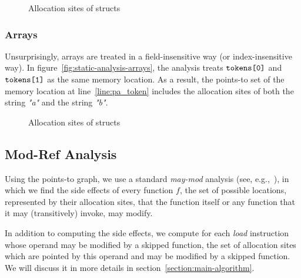 \begin{figure}
  \captionsetup[subfloat]{labelformat=empty}
  \subfloat[]{
    
    \label{fig:static-analysis-structs}
  }
  \caption{Allocation sites of structs}
\end{figure}

\subsubsection{Arrays}
Unsurprisingly, arrays are treated in a field-insensitive way (or index-insensitive way).
In figure~\ref{fig:static-analysis-arrays},
the analysis treats $\texttt{tokens[0]}$ and $\texttt{tokens[1]}$ as the same memory location.
As a result, the points-to set of the memory location at line~\ref{line:pa_token}
includes the allocation sites of both the string \textit{"a"} and the string \textit{"b"}.

\begin{figure}
  \captionsetup[subfloat]{labelformat=empty}
  \subfloat[]{
    
    \label{fig:static-analysis-arrays}
  }
  \caption{Allocation sites of structs}
\end{figure}

\subsection{Mod-Ref Analysis}
Using the points-to graph, we use a
standard \emph{may-mod} analysis (see, e.g.,~\cite{dragon-book}), in
which we find the side effects of every function $f$, \ie the set of
possible locations, represented by their allocation sites, that the
function itself or any function that it may (transitively) invoke, may
modify.

In addition to computing the side effects,
we compute for each \textit{load} instruction whose operand may be modified by a skipped function,
the set of allocation sites which are pointed by this operand and may be modified by a skipped function.
We will discuss it in more details in section~\ref{section:main-algorithm}.


